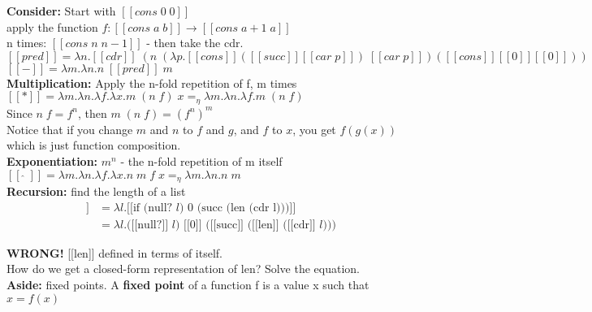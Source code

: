 \documentclass[11pt]{article}
\begin{document}
{\bf Consider:} Start with $[[cons\;0\;0]]$ \\

apply the function $f:[[cons\;a\;b]] \rightarrow [[cons\;a+1\;a]]$ \\

n times: $[[cons\;n\;n-1]]$ - then take the cdr. \\

$[[pred]] = \lambda n.[[cdr]]\;(n\;(\lambda p.[[cons]]([[succ]][[car\;p]])\;[[car\;p]])([[cons]][[0]][[0]]))$ \\

$[[-]] = \lambda m.\lambda n.n\;[[pred]]\;m$ \\

{\bf Multiplication:} Apply the n-fold repetition of f, m times \\

$[[*]] = \lambda m.\lambda n.\lambda f.\lambda x.m\;(n\;f)\;x =_\eta \lambda m. \lambda n.\lambda f.m\;(n\;f)$ \\

Since $n\;f = f^n$, then $m\;(n\;f) = (f^n)^m$ \\

Notice that if you change $m$ and $n$ to $f$ and $g$, and $f$ to $x$, you get $f(g(x))$ which is just function composition. \\

{\bf Exponentiation:} $m^n$ - the n-fold repetition of m itself \\

$[[\;\widehat{}\;]] = \lambda m.\lambda n.\lambda f.\lambda x.n\;m\;f\;x =_\eta \lambda m.\lambda n.n\;m$ \\

\textbf{Recursion:} find the length of a list 
\begin{align*}
[[len]] &= \lambda l.[[\text{if (null? $l$) 0 (succ (len (cdr l)))]]}\\
&= \lambda l.\text{([[null?]] $l$) [[0]] ([[succ]] ([[len]] ([[cdr]] $l$)))}
\end{align*}

{\bf WRONG!} [[len]] defined in terms of itself. \\

How do we get a closed-form representation of len? Solve the equation. \\

{\bf Aside:} fixed points. A {\bf fixed point} of a function f is a value x such that $x = f(x)$ \\
\end{document}
